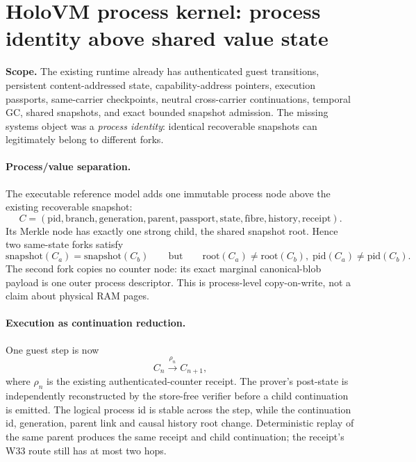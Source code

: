 \section*{HoloVM process kernel: process identity above shared value state}

\noindent\textbf{Scope.}
The existing runtime already has authenticated guest transitions, persistent
content-addressed state, capability-address pointers, execution passports,
same-carrier checkpoints, neutral cross-carrier continuations, temporal GC,
shared snapshots, and exact bounded snapshot admission. The missing systems
object was a \emph{process identity}: identical recoverable snapshots can
legitimately belong to different forks.

\paragraph{Process/value separation.}
The executable reference model
 adds one immutable process node
above the existing recoverable snapshot:
\[
 C=
 (\mathrm{pid},\mathrm{branch},\mathrm{generation},\mathrm{parent},
  \mathrm{passport},\mathrm{state},\mathrm{fibre},
  \mathrm{history},\mathrm{receipt}).
\]
Its Merkle node has exactly one strong child, the shared snapshot root. Hence
two same-state forks satisfy
\[
 \boxed{\mathrm{snapshot}(C_a)=\mathrm{snapshot}(C_b)}
 \qquad\text{but}\qquad
 \boxed{\mathrm{root}(C_a)\ne\mathrm{root}(C_b),\;
        \mathrm{pid}(C_a)\ne\mathrm{pid}(C_b).}
\]
The second fork copies no counter node: its exact marginal canonical-blob
payload is one outer process descriptor. This is process-level copy-on-write,
not a claim about physical RAM pages.

\paragraph{Execution as continuation reduction.}
One guest step is now
\[
 C_n\xrightarrow{\rho_n}C_{n+1},
\]
where $\rho_n$ is the existing authenticated-counter receipt. The prover's
post-state is independently reconstructed by the store-free verifier before a
child continuation is emitted. The logical process id is stable across the
step, while the continuation id, generation, parent link and causal history root
change. Deterministic replay of the same parent produces the same receipt and
child continuation; the receipt's W33 route still has at most two hops.


